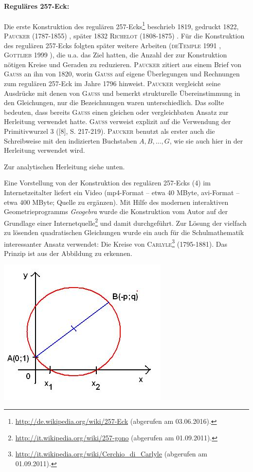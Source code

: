 \documentclass[11pt]{article}
\begin{document}
\paragraph{Reguläres 257-Eck:}
Die erste Konstruktion des regulären
257-Ecks\footnote{\url{http://de.wikipedia.org/wiki/257-Eck} (abgerufen am
  03.06.2016).} beschrieb 1819, gedruckt 1822, \textsc{Paucker} (1787-1855)
\cite{Paucker1822}, später 1832 \textsc{Richelot} (1808-1875)
\cite{Richelot1832}. Für die Konstruktion des regulären 257-Ecks folgten
später weitere Arbeiten (\textsc{deTemple} 1991 \cite{deTemple1991},
\textsc{Gottlieb} 1999 \cite{Gottlieb1999}), die u.a. das Ziel hatten, die
Anzahl der zur Konstruktion nötigen Kreise und Geraden zu reduzieren.
\textsc{Paucker} zitiert aus einem Brief von \textsc{Gauss} an ihn von 1820,
worin \textsc{Gauss} auf eigene Überlegungen und Rechnungen zum regulären
257-Eck im Jahre 1796 hinweist. \textsc{Paucker} vergleicht seine Ausdrücke
mit denen von \textsc{Gauss} und bemerkt strukturelle Übereinstimmung in den
Gleichungen, nur die Bezeichnungen waren unterschiedlich. Das sollte bedeuten,
dass bereits \textsc{Gauss} einen gleichen oder vergleichbaten Ansatz zur
Herleitung verwendet hatte. \textsc{Gauss} verweist explizit auf die
Verwendung der Primitivwurzel 3 ([8], S. 217-219). \textsc{Paucker} benutzt
als erster auch die Schreibweise mit den indizierten Buchstaben $A, B, ...,
G$, wie sie auch hier in der Herleitung verwendet wird.

Zur analytischen Herleitung siehe unten.

Eine Vorstellung von der Konstruktion des regulären 257-Ecks (4) im
Internetzeitalter liefert ein Video (mp4-Format -- etwa 40 MByte, avi-Format
-- etwa 400 MByte; Quelle zu ergänzen). Mit Hilfe des modernen interaktiven
Geometrieprogramms \emph{Geogebra} wurde die Konstruktion vom Autor auf der
Grundlage einer
Internetquelle\footnote{\url{http://it.wikipedia.org/wiki/257-gono} (abgerufen
  am 01.09.2011).} und damit \cite{deTemple1991} durchgeführt. Zur Lösung der
vielfach zu lösenden quadratischen Gleichungen wurde ein auch für die
Schulmathematik interessanter Ansatz verwendet: Die Kreise von
\textsc{Carlyle}\footnote{\url{http://it.wikipedia.org/wiki/Cerchio_di_Carlyle}
  (abgerufen am 01.09.2011).} (1795-1881). Das Prinzip ist aus der Abbildung
zu erkennen.

\begin{center}
  \includegraphics[width=.7\textwidth]{CarlyleKreis.jpg}
\end{center}
\end{document}
